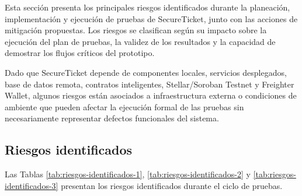 \documentclass[12pt,letterpaper]{article}
\newcommand{\NombreProyecto}{SecureTicket}
\begin{document}
Esta sección presenta los principales riesgos identificados durante la planeación, implementación y ejecución de pruebas de \NombreProyecto{}, junto con las acciones de mitigación propuestas. Los riesgos se clasifican según su impacto sobre la ejecución del plan de pruebas, la validez de los resultados y la capacidad de demostrar los flujos críticos del prototipo.

Dado que \NombreProyecto{} depende de componentes locales, servicios desplegados, base de datos remota, contratos inteligentes, Stellar/Soroban Testnet y Freighter Wallet, algunos riesgos están asociados a infraestructura externa o condiciones de ambiente que pueden afectar la ejecución formal de las pruebas sin necesariamente representar defectos funcionales del sistema.

\subsection{Riesgos identificados}

Las Tablas \ref{tab:riesgos-identificados-1}, \ref{tab:riesgos-identificados-2} y \ref{tab:riesgos-identificados-3} presentan los riesgos identificados durante el ciclo de pruebas.
\end{document}
